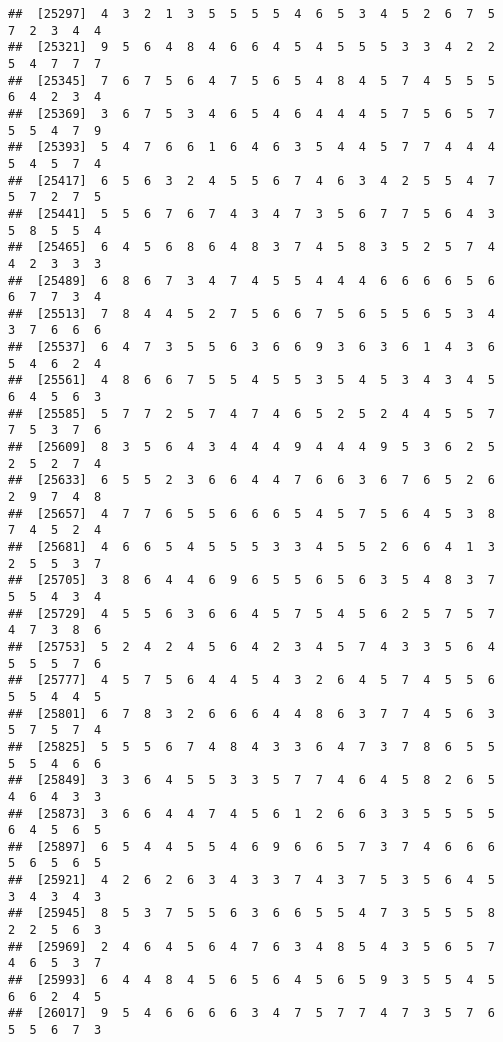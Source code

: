 \documentclass[
]{book}
\begin{document}
\begin{verbatim}
##  [25297]  4  3  2  1  3  5  5  5  5  4  6  5  3  4  5  2  6  7  5  7  2  3  4  4
##  [25321]  9  5  6  4  8  4  6  6  4  5  4  5  5  5  3  3  4  2  2  5  4  7  7  7
##  [25345]  7  6  7  5  6  4  7  5  6  5  4  8  4  5  7  4  5  5  5  6  4  2  3  4
##  [25369]  3  6  7  5  3  4  6  5  4  6  4  4  4  5  7  5  6  5  7  5  5  4  7  9
##  [25393]  5  4  7  6  6  1  6  4  6  3  5  4  4  5  7  7  4  4  4  5  4  5  7  4
##  [25417]  6  5  6  3  2  4  5  5  6  7  4  6  3  4  2  5  5  4  7  5  7  2  7  5
##  [25441]  5  5  6  7  6  7  4  3  4  7  3  5  6  7  7  5  6  4  3  5  8  5  5  4
##  [25465]  6  4  5  6  8  6  4  8  3  7  4  5  8  3  5  2  5  7  4  4  2  3  3  3
##  [25489]  6  8  6  7  3  4  7  4  5  5  4  4  4  6  6  6  6  5  6  6  7  7  3  4
##  [25513]  7  8  4  4  5  2  7  5  6  6  7  5  6  5  5  6  5  3  4  3  7  6  6  6
##  [25537]  6  4  7  3  5  5  6  3  6  6  9  3  6  3  6  1  4  3  6  5  4  6  2  4
##  [25561]  4  8  6  6  7  5  5  4  5  5  3  5  4  5  3  4  3  4  5  6  4  5  6  3
##  [25585]  5  7  7  2  5  7  4  7  4  6  5  2  5  2  4  4  5  5  7  7  5  3  7  6
##  [25609]  8  3  5  6  4  3  4  4  4  9  4  4  4  9  5  3  6  2  5  2  5  2  7  4
##  [25633]  6  5  5  2  3  6  6  4  4  7  6  6  3  6  7  6  5  2  6  2  9  7  4  8
##  [25657]  4  7  7  6  5  5  6  6  6  5  4  5  7  5  6  4  5  3  8  7  4  5  2  4
##  [25681]  4  6  6  5  4  5  5  5  3  3  4  5  5  2  6  6  4  1  3  2  5  5  3  7
##  [25705]  3  8  6  4  4  6  9  6  5  5  6  5  6  3  5  4  8  3  7  5  5  4  3  4
##  [25729]  4  5  5  6  3  6  6  4  5  7  5  4  5  6  2  5  7  5  7  4  7  3  8  6
##  [25753]  5  2  4  2  4  5  6  4  2  3  4  5  7  4  3  3  5  6  4  5  5  5  7  6
##  [25777]  4  5  7  5  6  4  4  5  4  3  2  6  4  5  7  4  5  5  6  5  5  4  4  5
##  [25801]  6  7  8  3  2  6  6  6  4  4  8  6  3  7  7  4  5  6  3  5  7  5  7  4
##  [25825]  5  5  5  6  7  4  8  4  3  3  6  4  7  3  7  8  6  5  5  5  5  4  6  6
##  [25849]  3  3  6  4  5  5  3  3  5  7  7  4  6  4  5  8  2  6  5  4  6  4  3  3
##  [25873]  3  6  6  4  4  7  4  5  6  1  2  6  6  3  3  5  5  5  5  6  4  5  6  5
##  [25897]  6  5  4  4  5  5  4  6  9  6  6  5  7  3  7  4  6  6  6  5  6  5  6  5
##  [25921]  4  2  6  2  6  3  4  3  3  7  4  3  7  5  3  5  6  4  5  3  4  3  4  3
##  [25945]  8  5  3  7  5  5  6  3  6  6  5  5  4  7  3  5  5  5  8  2  2  5  6  3
##  [25969]  2  4  6  4  5  6  4  7  6  3  4  8  5  4  3  5  6  5  7  4  6  5  3  7
##  [25993]  6  4  4  8  4  5  6  5  6  4  5  6  5  9  3  5  5  4  5  6  6  2  4  5
##  [26017]  9  5  4  6  6  6  6  3  4  7  5  7  7  4  7  3  5  7  6  5  5  6  7  3

\end{verbatim}
\end{document}
